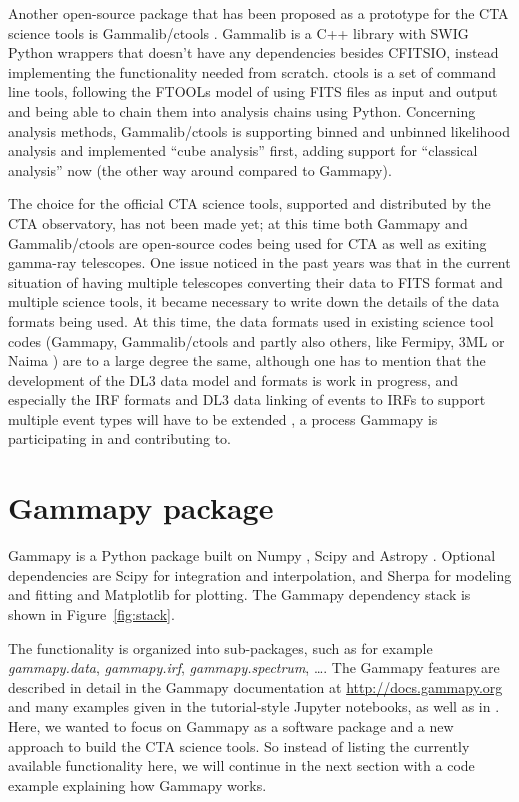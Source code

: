 \documentclass{PoS}
\newcommand{\url}[1]{\href{#1}{#1}}
\begin{document}
Another open-source package that has been proposed as a prototype for the CTA
science tools is Gammalib/ctools \cite{ctools}. Gammalib is a C++ library with
SWIG Python wrappers that doesn't have any dependencies besides CFITSIO, instead
implementing the functionality needed from scratch. ctools is a set of command
line tools, following the FTOOLs model of using FITS files as input and output
and being able to chain them into analysis chains using Python. Concerning
analysis methods, Gammalib/ctools is supporting binned and unbinned likelihood
analysis and implemented ``cube analysis'' first, adding support for ``classical
analysis'' now (the other way around compared to Gammapy).

The choice for the official CTA science tools, supported and distributed by the
CTA observatory, has not been made yet; at this time both Gammapy and
Gammalib/ctools are open-source codes being used for CTA as well as exiting
gamma-ray telescopes. One issue noticed in the past years was that in the
current situation of having multiple telescopes converting their data to FITS
format and multiple science tools, it became necessary to write down the details
of the data formats being used. At this time, the data formats used in existing
science tool codes (Gammapy, Gammalib/ctools and partly also others, like
Fermipy, 3ML \cite{3ml} or Naima \cite{naima}) are to a large degree the same,
although one has to mention that the development of the DL3 data model and
formats is work in progress, and especially the IRF formats and DL3 data linking
of events to IRFs to support multiple event types will have to be extended
\cite{opendata}, a process Gammapy is participating in and contributing to.

\section{Gammapy package}
\label{sec:gammapy}

Gammapy is a Python package built on Numpy \cite{numpy}, Scipy \cite{scipy} and
Astropy \cite{astropy}. Optional dependencies are Scipy for integration and
interpolation, and Sherpa \cite{sherpa2001, sherpa2009, sherpa2011} for modeling
and fitting and Matplotlib \cite{matplotlib} for plotting. The Gammapy
dependency stack is shown in Figure~\ref{fig:stack}.

The functionality is organized into sub-packages, such as for example {\it
gammapy.data}, {\it gammapy.irf}, {\it gammapy.spectrum}, \ldots . The Gammapy
features are described in detail in the Gammapy documentation at
\url{http://docs.gammapy.org} and many examples given in the tutorial-style
Jupyter notebooks, as well as in \cite{gammapy-icrc2015}. Here, we wanted to
focus on Gammapy as a software package and a new approach to build the CTA
science tools. So instead of listing the currently available functionality here,
we will continue in the next section with a code example explaining how Gammapy
works.
\end{document}
